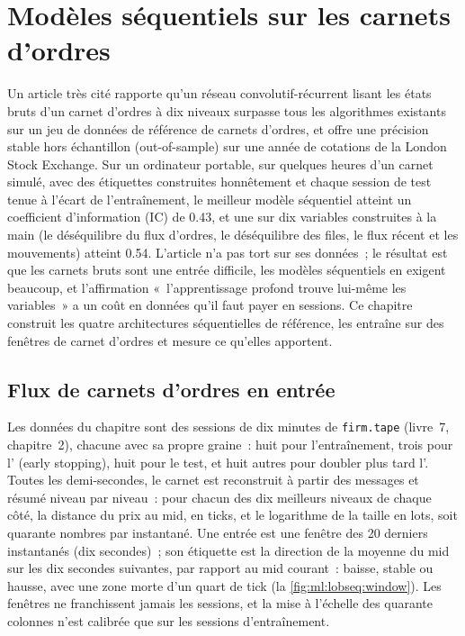 \chapter{Modèles séquentiels sur les carnets d'ordres}\label{ch:ml:sequence-models-on-order-books}

Un article très cité rapporte qu'un réseau convolutif-récurrent lisant les états bruts d'un carnet d'ordres à dix niveaux
surpasse tous les algorithmes existants sur un jeu de données de référence de carnets d'ordres, et offre une précision stable hors échantillon (out-of-sample) sur une
année de cotations de la London Stock Exchange. Sur un ordinateur portable,
sur quelques heures d'un carnet simulé, avec des étiquettes construites honnêtement et chaque session de test tenue à l'écart de l'entraînement, le meilleur
modèle séquentiel atteint un coefficient d'information (IC) de 0.43, et une  sur dix variables construites à la main (le
déséquilibre du flux d'ordres, le déséquilibre des files, le flux récent et les mouvements) atteint 0.54. L'article n'a pas tort sur ses données~; le résultat est que
les carnets bruts sont une entrée difficile, les modèles séquentiels en exigent beaucoup, et l'affirmation «~l'apprentissage profond trouve
lui-même les variables~» a un coût en données qu'il faut payer en sessions. Ce chapitre construit les quatre architectures séquentielles de référence,
les entraîne sur des fenêtres de carnet d'ordres et mesure ce qu'elles apportent.

\section{Flux de carnets d'ordres en entrée}

Les données du chapitre sont des sessions de dix minutes de \texttt{firm.tape} (livre~7, chapitre~2), chacune avec sa propre graine~: huit pour
l'entraînement, trois pour l' (early stopping), huit pour le test, et huit autres pour doubler plus tard l'. Toutes les
demi-secondes, le carnet est reconstruit à partir des messages et résumé niveau par niveau~: pour chacun des dix meilleurs niveaux de chaque côté,
la distance du prix au mid, en ticks, et le logarithme de la taille en lots, soit quarante nombres par instantané. Une
entrée est une fenêtre des 20 derniers instantanés (dix secondes)~; son étiquette est la direction de la moyenne du mid sur les dix
secondes suivantes, par rapport au mid courant~: baisse, stable ou hausse, avec une zone morte d'un quart de tick (la \cref{fig:ml:lobseq:window}).
Les fenêtres ne franchissent jamais les sessions, et la mise à l'échelle des quarante colonnes n'est calibrée que sur les sessions d'entraînement.


